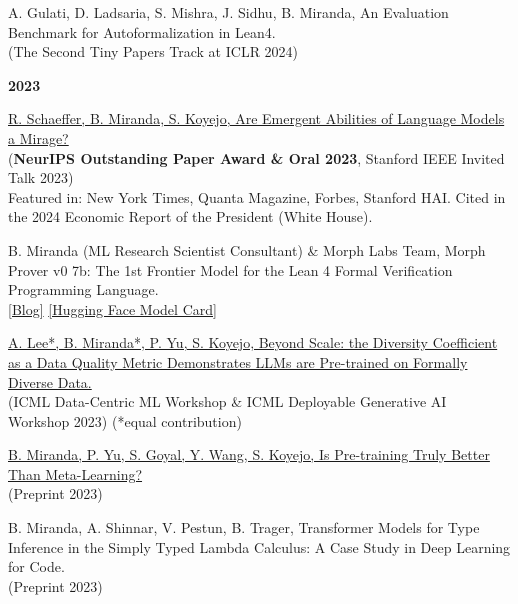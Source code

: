 \documentclass{article}
\newenvironment{changemargin}[2]{%
  \begin{list}{}{%
    \setlength{\topsep}{0pt}%
    \setlength{\leftmargin}{#1}%
    \setlength{\rightmargin}{#2}%
    \setlength{\listparindent}{\parindent}%
    \setlength{\itemindent}{\parindent}%
    \setlength{\parsep}{\parskip}%
  }%
  \item[]}{\end{list}
}
\newenvironment{body} {
	\vspace*{-16pt}
	\begin{changemargin}{-0.25in}{-0.5in}
  }	
	{\end{changemargin}
}
\begin{document}
\begin{body}
    \vspace{10pt}
    {A. Gulati, D. Ladsaria, S. Mishra, J. Sidhu, B. Miranda,
    An Evaluation Benchmark for Autoformalization in Lean4.}
    \\
    (The Second Tiny Papers Track at ICLR 2024)

    \vspace{12pt}
    \textbf{\large 2023}
    \vspace{4pt}

    \vspace{10pt}
    \href{https://arxiv.org/abs/2304.15004}
    {R. Schaeffer, B. Miranda, S. Koyejo,
    Are Emergent Abilities of Language Models a Mirage?}
    \\
    (\textbf{NeurIPS Outstanding Paper Award \& Oral 2023}, Stanford IEEE Invited Talk 2023)
    \\
    Featured in: New York Times, Quanta Magazine, Forbes, Stanford HAI.
    Cited in the 2024 Economic Report of the President (White House).

    \vspace{10pt}
    {B. Miranda (ML Research Scientist Consultant) \& Morph Labs Team,
    Morph Prover v0 7b: The 1st Frontier Model for the Lean 4 Formal Verification Programming Language.}
    \\
    \href{https://morph.so/blog/the-personal-ai-proof-engineer/}{[Blog]}
    \href{https://huggingface.co/morph-labs/morph-prover-v0-7b}{[Hugging Face Model Card]}

    \vspace{10pt}
    \href{https://arxiv.org/abs/2306.13840}
    {A. Lee*, B. Miranda*, P. Yu, S. Koyejo,
    Beyond Scale: the Diversity Coefficient as a Data Quality Metric Demonstrates LLMs are Pre-trained on Formally Diverse Data.}
    \\
    (ICML Data-Centric ML Workshop \& ICML Deployable Generative AI Workshop 2023) (*equal contribution)

    \vspace{10pt}
    \href{https://arxiv.org/abs/2306.13841}
    {B. Miranda, P. Yu, S. Goyal, Y. Wang, S. Koyejo,
    Is Pre-training Truly Better Than Meta-Learning?}
    \\
    (Preprint 2023)

    \vspace{10pt}
    {B. Miranda, A. Shinnar, V. Pestun, B. Trager,
    Transformer Models for Type Inference in the Simply Typed Lambda Calculus: A Case Study in Deep Learning for Code.}
    \\
    (Preprint 2023)


\end{body}
\end{document}
